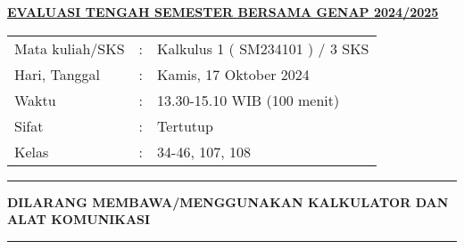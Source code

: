 \documentclass[11pt,openany,a4paper]{article}
\renewcommand{\headrulewidth}{0pt}
\renewcommand{\footrulewidth}{0pt}
\begin{document}
\newpage
\renewcommand{\arraystretch}{1}
\fancyhead{}
\fancyfoot{}
\fancyhead[r]{}
\renewcommand{\headrulewidth}{0pt}
\renewcommand{\footrulewidth}{0pt}
\begin{center}
    {\underline{\textbf{\MakeUppercase{Evaluasi Tengah Semester Bersama Genap 2024/2025}}}}
\end{center}

\begin{center}
    \begin{tabular}{lcl}
        Mata kuliah/SKS & : & Kalkulus 1 ( SM234101 ) / 3 SKS \\
        Hari, Tanggal   & : & Kamis, 17 Oktober 2024          \\
        Waktu           & : & 13.30-15.10 WIB (100 menit)     \\
        Sifat           & : & Tertutup                        \\
        Kelas           & : & 34-46, 107, 108
    \end{tabular}
\end{center}

\noindent\rule{\textwidth}{2.pt}

\setlength{\parindent}{5pt}
\setlength{\parindent}{5pt}
\setlength{\parindent}{5pt}
\par \textbf{\small\MakeUppercase{dilarang membawa/menggunakan kalkulator dan alat komunikasi}}
\par {}
\noindent\rule{\textwidth}{2.pt}
\end{document}
